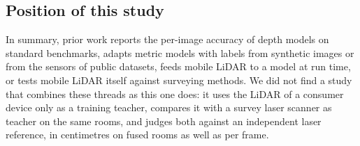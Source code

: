 \subsection{Position of this study}
In summary, prior work reports the per-image accuracy of depth models on standard benchmarks, adapts metric models
with labels from synthetic images or from the sensors of public datasets, feeds mobile LiDAR to a model at run time,
or tests mobile LiDAR itself against surveying methods. We did not find a study that combines these threads as this one
does: it uses the LiDAR of a consumer device only as a training teacher, compares it with a survey laser scanner as
teacher on the same rooms, and judges both against an independent laser reference, in centimetres on fused rooms as
well as per frame.
